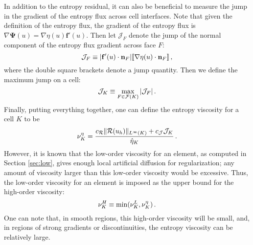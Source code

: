 In addition to the entropy residual, it can
also be beneficial to measure the jump in the gradient of the entropy flux
across cell interfaces.
Note that given the definition of the entropy flux, the gradient of the entropy
flux is $\nabla\mathbf{\Psi}(u)=\nabla\eta(u)\mathbf{f}'(u)$. Then let
$\mathcal{J}_F$ denote the jump of the normal component of the entropy flux
gradient across face $F$:
\begin{equation}
  \mathcal{J}_F \equiv |\mathbf{f}'(u)\cdot\mathbf{n}_F|
    [\![\nabla\eta(u)\cdot\mathbf{n}_F]\!] \,,
\end{equation}
where the double square brackets denote a jump quantity. Then we define the
maximum jump on a cell:
\begin{equation}
  \mathcal{J}_K \equiv \max\limits_{F\in\mathcal{F}(K)} |\mathcal{J}_F| \,.
\end{equation}
Finally, putting everything together, one can define the entropy viscosity
for a cell $K$ to be
\begin{equation}
  \nu^\eta_K = \frac{c_\mathcal{R}\|\mathcal{R}(u_h)\|_{L^\infty(K)}
    + c_\mathcal{J}\mathcal{J}_K}{\hat{\eta}_K}
    \,.
\end{equation}
However, it is known that the low-order viscosity for an element, as computed
in Section \ref{sec:low}, gives enough local artificial diffusion for
regularization; any amount of viscosity larger than this low-order viscosity would be 
excessive. Thus, the low-order viscosity for an element is
imposed as the upper bound for the high-order viscosity:
\begin{equation}
  \nu^H_K \equiv \min(\nu^L_K, \nu^\eta_K) \,.
\end{equation}
One can note that, in smooth regions, this high-order viscosity will be
small, and, in regions of strong gradients or discontinuities,
the entropy viscosity can be relatively large.

